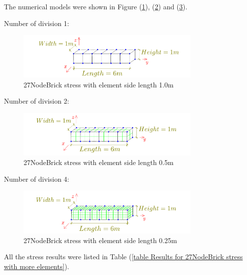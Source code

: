 \documentclass[fleqn,11pt,letter]{article}
\begin{document}
The numerical models were shown in Figure (\ref{fig 27NodeBrick stress with element side length 1.0m}), (\ref{fig 27NodeBrick stress with element side length 0.5m}) and (\ref{fig 27NodeBrick stress with element side length 0.25m}). 


Number of division 1:

\begin{figure}[H]
  \centering
  \includegraphics[width=9cm]{../Figure_files/27NodeBrick/beam_8brick.pdf}
  \caption{27NodeBrick stress with element side length 1.0m}
  \label{fig 27NodeBrick stress with element side length 1.0m}
\end{figure}

Number of division 2:

\begin{figure}[H]
  \centering
  \includegraphics[width=9cm]{../Figure_files/27NodeBrick/beam_8brick_more_2.pdf}
  \caption{27NodeBrick stress with element side length 0.5m}
  \label{fig 27NodeBrick stress with element side length 0.5m}
\end{figure}

Number of division 4:

\begin{figure}[H]
  \centering
  \includegraphics[width=9cm]{../Figure_files/27NodeBrick/beam_8brick_more.pdf}
  \caption{27NodeBrick stress with element side length 0.25m}
  \label{fig 27NodeBrick stress with element side length 0.25m}
\end{figure}


All the stress results were listed in Table (\ref{table Results for 27NodeBrick stress with more elements}). 
\end{document}
